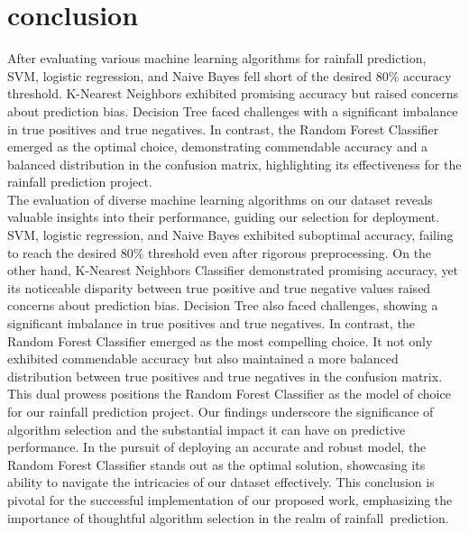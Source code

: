 \documentclass[conference]{IEEEtran}
\begin{document}
\section{\textbf{conclusion}}
After evaluating various machine learning algorithms for rainfall prediction, SVM, logistic regression, and Naive Bayes fell short of the desired 80\% accuracy threshold. K-Nearest Neighbors exhibited promising accuracy but raised concerns about prediction bias. Decision Tree faced challenges with a significant imbalance in true positives and true negatives. In contrast, the Random Forest Classifier emerged as the optimal choice, demonstrating commendable accuracy and a balanced distribution in the confusion matrix, highlighting its effectiveness for the rainfall prediction project.
\\ \indent The evaluation of diverse machine learning algorithms on our dataset reveals valuable insights into their performance, guiding our selection for deployment. SVM, logistic regression, and Naive Bayes exhibited suboptimal accuracy, failing to reach the desired 80\% threshold even after rigorous preprocessing. On the other hand, K-Nearest Neighbors Classifier demonstrated promising accuracy, yet its noticeable disparity between true positive and true negative values raised concerns about prediction bias. Decision Tree also faced challenges, showing a significant imbalance in true positives and true negatives. In contrast, the Random Forest Classifier emerged as the most compelling choice. It not only exhibited commendable accuracy but also maintained a more balanced distribution between true positives and true negatives in the confusion matrix. This dual prowess positions the Random Forest Classifier as the model of choice for our rainfall prediction project. Our findings underscore the significance of algorithm selection and the substantial impact it can have on predictive performance. In the pursuit of deploying an accurate and robust model, the Random Forest Classifier stands out as the optimal solution, showcasing its ability to navigate the intricacies of our dataset effectively. This conclusion is pivotal for the successful implementation of our proposed work, emphasizing the importance of thoughtful algorithm selection in the realm of rainfall prediction.
\end{document}
